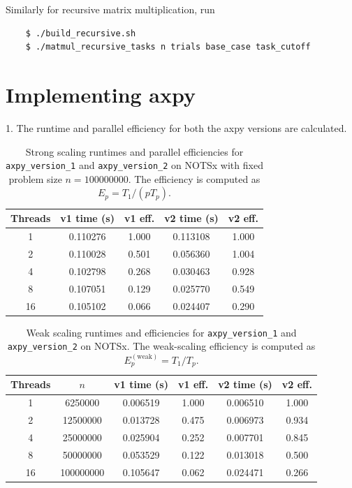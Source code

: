 \documentclass{article}[12pt]
\begin{document}
Similarly for recursive matrix multiplication, run

\begin{verbatim}
    $ ./build_recursive.sh
    $ ./matmul_recursive_tasks n trials base_case task_cutoff
\end{verbatim}

\section{Implementing axpy}
 
1. The runtime and parallel efficiency for both the axpy versions are calculated. 

\begin{table}[h!]
\centering
\begin{tabular}{c c c c c}
\hline
\textbf{Threads} & \textbf{v1 time (s)} & \textbf{v1 eff.} & \textbf{v2 time (s)} & \textbf{v2 eff.} \\
\hline
1  & 0.110276 & 1.000 & 0.113108 & 1.000 \\
2  & 0.110028 & 0.501 & 0.056360 & 1.004 \\
4  & 0.102798 & 0.268 & 0.030463 & 0.928 \\
8  & 0.107051 & 0.129 & 0.025770 & 0.549 \\
16 & 0.105102 & 0.066 & 0.024407 & 0.290 \\
\hline
\end{tabular}
\caption{Strong scaling runtimes and parallel efficiencies for \texttt{axpy\_version\_1} and \texttt{axpy\_version\_2} on NOTSx with fixed problem size $n=100000000$. The efficiency is computed as $E_p = T_1/(pT_p)$.}
\label{tab:strong_scaling_axpy_notsx}
\end{table}


\begin{table}[H]
\centering
\begin{tabular}{c c c c c c}
\hline
\textbf{Threads} & \textbf{$n$} & \textbf{v1 time (s)} & \textbf{v1 eff.} & \textbf{v2 time (s)} & \textbf{v2 eff.} \\
\hline
1  & 6250000   & 0.006519 & 1.000 & 0.006510 & 1.000 \\
2  & 12500000  & 0.013728 & 0.475 & 0.006973 & 0.934 \\
4  & 25000000  & 0.025904 & 0.252 & 0.007701 & 0.845 \\
8  & 50000000  & 0.053529 & 0.122 & 0.013018 & 0.500 \\
16 & 100000000 & 0.105647 & 0.062 & 0.024471 & 0.266 \\
\hline
\end{tabular}
\caption{Weak scaling runtimes and efficiencies for \texttt{axpy\_version\_1} and \texttt{axpy\_version\_2} on NOTSx. The weak-scaling efficiency is computed as $E_p^{(\mathrm{weak})}=T_1/T_p$.}
\label{tab:weak_scaling_axpy_notsx}
\end{table}
\end{document}
